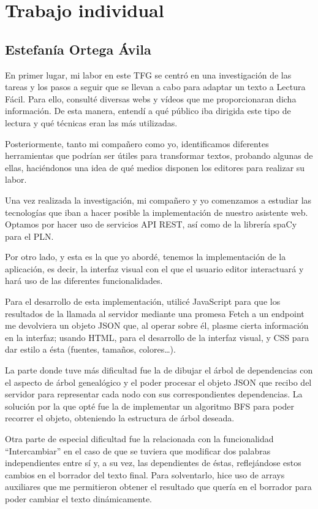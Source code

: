 \chapter{Trabajo individual}
\label{cap:trabajoIndividual}

\section{Estefanía Ortega Ávila}

En primer lugar, mi labor en este TFG se centró en una investigación de las tareas y los pasos a seguir que se llevan a cabo para adaptar un texto a Lectura Fácil. Para ello, consulté diversas webs y vídeos que me proporcionaran dicha información. De esta manera, entendí a qué público iba dirigida este tipo de lectura y qué técnicas eran las más utilizadas. 

Posteriormente, tanto mi compañero como yo, identificamos diferentes herramientas que podrían ser útiles para transformar textos, probando algunas de ellas, haciéndonos una idea de qué medios disponen los editores para realizar su labor.

Una vez realizada la investigación, mi compañero y yo comenzamos a estudiar las tecnologías que iban a hacer posible la implementación de nuestro asistente web. Optamos por hacer uso de servicios API REST, así como de la librería spaCy para el PLN.

Por otro lado, y esta es la que yo abordé, tenemos la implementación de la aplicación, es decir, la interfaz visual con el que el usuario editor interactuará y hará uso de las diferentes funcionalidades. 

Para el desarrollo de esta implementación, utilicé JavaScript para que los resultados de la llamada al servidor mediante una promesa Fetch a un endpoint me devolviera un objeto JSON que, al operar sobre él, plasme cierta información en la interfaz; usando HTML, para el desarrollo de la interfaz visual, y CSS para dar estilo a ésta (fuentes, tamaños, colores…).


La parte donde tuve más dificultad fue la de dibujar el árbol de dependencias con el aspecto de árbol genealógico y el poder procesar el objeto JSON que recibo del servidor para representar cada nodo con sus correspondientes dependencias. La solución por la que opté fue la de implementar un algoritmo BFS para poder recorrer el objeto, obteniendo la estructura de árbol deseada.

Otra parte de especial dificultad fue la relacionada con la funcionalidad ``Intercambiar'' en el caso de que se tuviera que modificar dos palabras independientes entre sí y, a su vez, las dependientes de éstas, reflejándose estos cambios en el borrador del texto final. Para solventarlo, hice uso de arrays auxiliares que me permitieron obtener el resultado que quería en el borrador para poder cambiar el texto dinámicamente.

